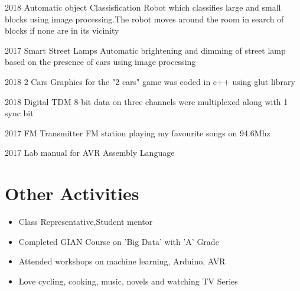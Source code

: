 \documentclass[print]{friggeri-cv} %
\begin{document}
\begin{entrylist}


\entry
{2018}
{Automatic object Classisfication}
{}
{Robot which classifies large and small blocks using image processing.The robot moves around the room in search of blocks if none are in its vicinity }
{}

\entry
{2017}
{Smart Street Lamps  }
{}
{Automatic brightening and dimming of street lamp based on the presence of cars using image processing}
{}



\entry
{2018}
{2 Cars}
{}
{Graphics for the "2 cars" game was coded in c++ using glut library}
{}

\entry
{2018}
{Digital TDM}
{}
{8-bit data on three channels were multiplexed along with 1 sync bit}
{}

\entry
{2017}
{FM Transmitter}
{}
{FM station playing my favourite songs on 94.6Mhz}
{}

\entry
{2017}
{Lab manual for AVR Assembly Language}
{}
{}
{}






\end{entrylist}



\section{Other Activities}


\begin{itemize}
	\item Class Representative,Student mentor
	\item Completed GIAN Course on 'Big Data' with 'A' Grade
	\item Attended workshops on machine learning, Arduino, AVR
	\item Love cycling, cooking, music, novels and watching TV Series 
\end{itemize}

 

\end{document}
